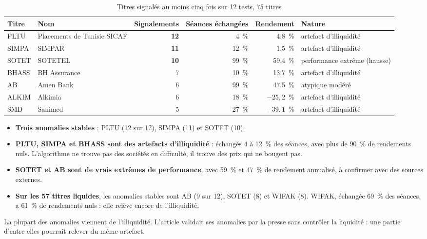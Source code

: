 \documentclass[11pt,a4paper]{article}
\newcommand{\pc}{~\%}
\begin{document}
\begin{table}[H]\centering\small
\caption{Titres signalés au moins cinq fois sur 12 tests, 75 titres}\label{tab:anomalies}
\begin{tabular}{llrrrl}\toprule
Titre & Nom & Signalements & Séances échangées & Rendement & Nature \\ \midrule
PLTU & Placements de Tunisie SICAF & \textbf{12} & 4\pc{} & 4,8\pc{} & artefact d'illiquidité \\
SIMPA & SIMPAR & \textbf{11} & 12\pc{} & 1,5\pc{} & artefact d'illiquidité \\
SOTET & SOTETEL & \textbf{10} & 99\pc{} & 59,4\pc{} & performance extrême (hausse) \\
BHASS & BH Assurance & 7 & 10\pc{} & 13,7\pc{} & artefact d'illiquidité \\
AB & Amen Bank & 6 & 99\pc{} & 47,5\pc{} & atypique modéré \\
ALKIM & Alkimia & 6 & 18\pc{} & $-25{,}2$\pc{} & artefact d'illiquidité \\
SMD & Sanimed & 5 & 27\pc{} & $-39{,}1$\pc{} & artefact d'illiquidité \\
\bottomrule\end{tabular}
\end{table}

\begin{itemize}
  \item \textbf{Trois anomalies stables} : PLTU (12 sur 12), SIMPA (11) et SOTET (10).
  \item \textbf{PLTU, SIMPA et BHASS sont des artefacts d'illiquidité} : échangés 4 à 12\pc{} des séances, avec plus de 90\pc{} de rendements nuls. L'algorithme ne trouve pas des sociétés en difficulté, il trouve des prix qui ne bougent pas.
  \item \textbf{SOTET et AB sont de vrais extrêmes de performance}, avec 59\pc{} et 47\pc{} de rendement annualisé, à confirmer avec des sources externes.
  \item \textbf{Sur les 57 titres liquides}, les anomalies stables sont AB (9 sur 12), SOTET (8) et WIFAK (8). WIFAK, échangée 69\pc{} des séances, a 61\pc{} de rendements nuls : elle relève encore de l'illiquidité.
\end{itemize}


\begin{retenir}
La plupart des anomalies viennent de l'illiquidité. L'article validait ses anomalies par la presse sans contrôler la liquidité : une partie d'entre elles pourrait relever du même artefact.
\end{retenir}
\end{document}
